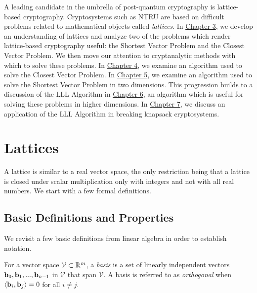 \documentclass[a4paper,12pt]{article}
\begin{document}
A leading candidate in the umbrella of post-quantum cryptography is lattice-based cryptography. Cryptosystems such as NTRU are based on difficult problems related to mathematical objects called \textit{lattices}. In \hyperref[Lattices]{Chapter 3}, we develop an understanding of lattices and analyze two of the problems which render lattice-based cryptography useful: the Shortest Vector Problem and the Closest Vector Problem. We then move our attention to cryptanalytic methods with which to solve these problems. In \hyperref[Babai]{Chapter 4}, we examine an algorithm used to solve the Closest Vector Problem. In \hyperref[Lagrange]{Chapter 5}, we examine an algorithm used to solve the Shortest Vector Problem in two dimensions. This progression builds to a discussion of the LLL Algorithm in \hyperref[LLL]{Chapter 6}, an algorithm which is useful for solving these problems in higher dimensions. In \hyperref[Knapsack]{Chapter 7}, we discuss an application of the LLL Algorithm in breaking knapsack cryptosystems. 


\newpage
\section{Lattices}\label{Lattices}

A lattice is similar to a real vector space, the only restriction being that a lattice is closed under scalar multiplication only with integers and not with all real numbers. We start with a few formal definitions.

\subsection{Basic Definitions and Properties}

We revisit a few basic definitions from linear algebra in order to establish notation.

\begin{defn}\label{basis}
For a vector space $\mathcal{V} \subset \mathbb{R}^m$, a \textit{basis} is a set of linearly independent vectors $ \mathbf{b}_0, \mathbf{b}_1, ... , \mathbf{b}_{n-1}$ in $\mathcal{V}$ that span $\mathcal{V}$. A basis is referred to as \textit{orthogonal} when $\langle \mathbf{b}_i, \mathbf{b}_j \rangle = 0$ for all $i \neq j$.
\end{defn}
\end{document}
